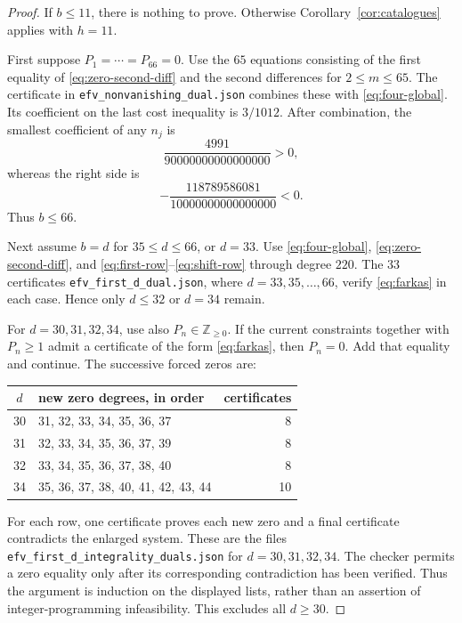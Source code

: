 \documentclass[12pt,a4paper]{article}
\numberwithin{equation}{section}
\theoremstyle{definition}
\newcommand{\Z}{\mathbb Z}
\begin{document}
\begin{proof}
If \(b\leq11\), there is nothing to prove. Otherwise
Corollary~\ref{cor:catalogues} applies with \(h=11\).

First suppose \(P_1=\cdots=P_{66}=0\).
Use the \(65\) equations consisting of the first equality of
\eqref{eq:zero-second-diff} and the second differences for
\(2\leq m\leq65\).
The certificate in \texttt{efv\_nonvanishing\_dual.json} combines
these with \eqref{eq:four-global}.
Its coefficient on the last cost inequality is \(3/1012\).
After combination, the smallest coefficient of any \(n_j\) is
\[
                  \frac{4991}{90000000000000000}>0,
\]
whereas the right side is
\[
                 -\frac{118789586081}{10000000000000000}<0.
\]
Thus \(b\leq66\).

Next assume \(b=d\) for \(35\leq d\leq66\), or \(d=33\).
Use \eqref{eq:four-global},
\eqref{eq:zero-second-diff}, and
\eqref{eq:first-row}--\eqref{eq:shift-row} through degree \(220\).
The \(33\) certificates \texttt{efv\_first\_d\_dual.json},
where \(d=33,35,\ldots,66\),
verify \eqref{eq:farkas} in each case.
Hence only \(d\leq32\) or \(d=34\) remain.

For \(d=30,31,32,34\), use also \(P_n\in\Z_{\geq0}\).
If the current constraints together with \(P_n\geq1\) admit a
certificate of the form \eqref{eq:farkas}, then \(P_n=0\).
Add that equality and continue. The successive forced zeros are:
\begin{center}\small
\begin{tabular}{c|l|r}
\toprule
\(d\)&new zero degrees, in order&certificates\\
\midrule
30&31, 32, 33, 34, 35, 36, 37&8\\
31&32, 33, 34, 35, 36, 37, 39&8\\
32&33, 34, 35, 36, 37, 38, 40&8\\
34&35, 36, 37, 38, 40, 41, 42, 43, 44&10\\
\bottomrule
\end{tabular}
\end{center}
For each row, one certificate proves each new zero and a final
certificate contradicts the enlarged system.
These are the files \texttt{efv\_first\_d\_integrality\_duals.json}
for \(d=30,31,32,34\).
The checker permits a zero equality only after its corresponding
contradiction has been verified. Thus the argument is induction on
the displayed lists, rather than an assertion of integer-programming
infeasibility.
This excludes all \(d\geq30\).
\end{proof}
\end{document}
